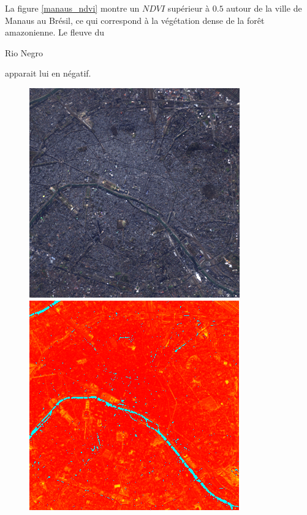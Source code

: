 \documentclass{book}
\begin{document}
La figure \ref{manaus_ndvi} montre un $NDVI$ supérieur à $0.5$ autour de la ville de Manaus au Brésil, ce qui correspond à la végétation dense de la for\^et amazonienne. Le fleuve
du \begin{itshape}Rio Negro\end{itshape} apparait lui en négatif.\\

\clearpage

\begin{figure}[H]
\centerline{
\includegraphics[scale=0.45]{images/Paris/12_rgb.png}
\includegraphics[scale=0.45]{images/Paris/12_ndvi.png}
}
\end{figure}
\end{document}
